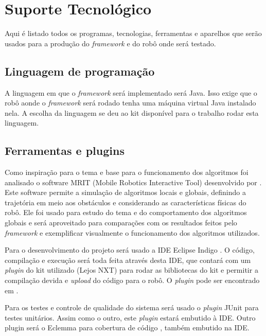 \chapter[Suporte Tecnológico]{Suporte Tecnológico}

Aqui é listado todos os programas, tecnologias, ferramentas e aparelhos que serão  usados para a produção do \textit{framework} e do robô onde será testado. 

\section{Linguagem de programação}

A linguagem em que o \textit{framework} será implementado será Java. Isso exige que o robô aonde o \textit{framework} será rodado tenha uma máquina virtual Java instalado nela. A escolha da linguagem se deu ao kit disponível para o trabalho rodar esta linguagem.

\section{Ferramentas e plugins}

Como inspiração para o tema e base para o funcionamento dos algoritmos foi analisado o software MRIT (Mobile Robotics Interactive Tool) \cite{MRIT_SITE} desenvolvido por \cite{Guzman2008}. Este software permite a simulação de algoritmos locais e globais, definindo a trajetória em meio aos obstáculos e considerando as características físicas do robô. Ele foi usado para estudo do tema e do comportamento dos algoritmos globais e será aproveitado para comparações com os resultados feitos pelo \textit{framework} e exemplificar visualmente o funcionamento dos algoritmos utilizados.

Para o desenvolvimento do projeto será usado a IDE Eclipse Indigo \cite{ECLIPSE_SITE}. O código, compilação e execução será toda feita através desta IDE, que contará com um \textit{plugin} do kit utilizado (Lejos NXT) para rodar as bibliotecas do kit e permitir a compilação devida e \textit{upload} do código para o robô. O \textit{plugin} pode ser encontrado em \cite{PLUGIN_NXT_SITE}.

Para os testes e controle de qualidade do sistema será usado o \textit{plugin} JUnit \cite{JUNIT_SITE} para testes unitários. Assim como o outro, este \textit{plugin} estará embutido à IDE. Outro plugin será o Eclemma para cobertura de código \cite{ECLEMMA_SITE}, também embutido na IDE.

